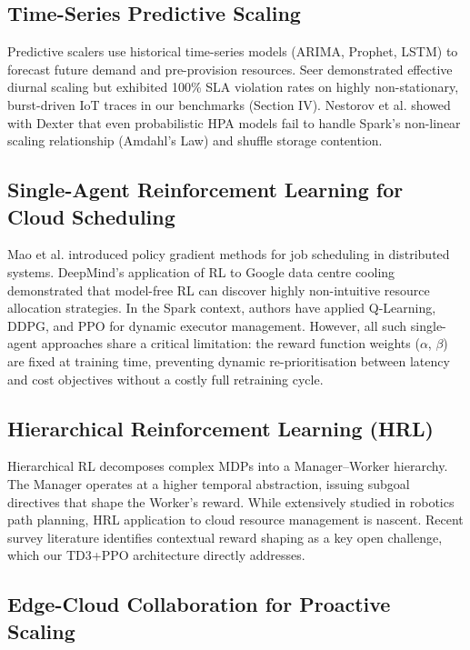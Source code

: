 \documentclass[10pt, conference, compsocconf]{IEEEtran}
\begin{document}
\subsection{Time-Series Predictive Scaling}

Predictive scalers use historical time-series models (ARIMA, Prophet, LSTM) to forecast future demand and pre-provision resources. Seer \cite{lu2016} demonstrated effective diurnal scaling but exhibited 100\% SLA violation rates on highly non-stationary, burst-driven IoT traces in our benchmarks (Section IV). Nestorov et al. \cite{nestorov2024dexter} showed with Dexter that even probabilistic HPA models fail to handle Spark's non-linear scaling relationship (Amdahl's Law) and shuffle storage contention.

\subsection{Single-Agent Reinforcement Learning for Cloud Scheduling}

Mao et al. \cite{mao2016resource} introduced policy gradient methods for job scheduling in distributed systems. DeepMind's application of RL to Google data centre cooling \cite{evans2016} demonstrated that model-free RL can discover highly non-intuitive resource allocation strategies. In the Spark context, authors have applied Q-Learning, DDPG, and PPO for dynamic executor management. However, all such single-agent approaches share a critical limitation: the reward function weights ($\alpha$, $\beta$) are fixed at training time, preventing dynamic re-prioritisation between latency and cost objectives without a costly full retraining cycle.

\subsection{Hierarchical Reinforcement Learning (HRL)}

Hierarchical RL decomposes complex MDPs into a Manager–Worker hierarchy. The Manager operates at a higher temporal abstraction, issuing subgoal directives that shape the Worker's reward. While extensively studied in robotics path planning, HRL application to cloud resource management is nascent. Recent survey literature \cite{zhou2024deep} identifies contextual reward shaping as a key open challenge, which our TD3+PPO architecture directly addresses.

\subsection{Edge-Cloud Collaboration for Proactive Scaling}
\end{document}

